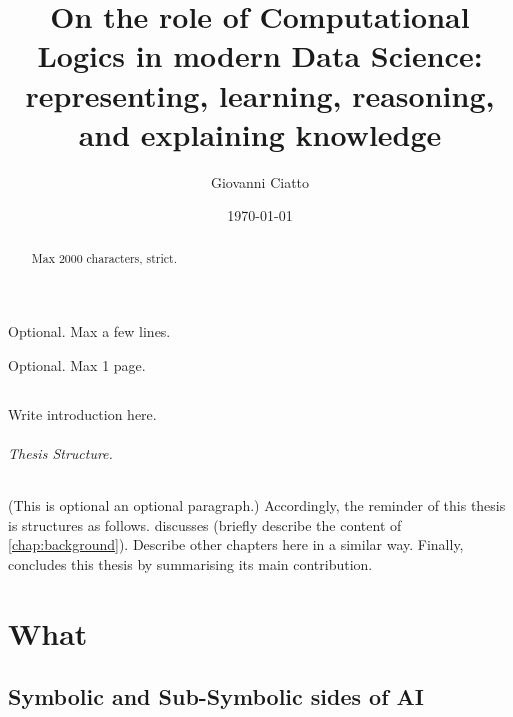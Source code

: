 \documentclass[12pt,a4paper,openright,twoside]{book}
\title{On the role of Computational Logics in modern Data Science: representing, learning, reasoning, and explaining knowledge}
\author{Giovanni Ciatto}
\date{\today}
\begin{document}
	
\frontmatter



\begin{abstract}	
Max 2000 characters, strict.
\end{abstract}

\begin{dedication} %
Optional. Max a few lines.
\end{dedication}

\begin{acknowledgements} %
Optional. Max 1 page.
\end{acknowledgements}

\tableofcontents   
\listoffigures     %
\lstlistoflistings %

\mainmatter

\chapter{\introductionname}
\label{chap:introduction}

Write introduction here.

%
\paragraph{Thesis Structure.} %
%

(This is optional an optional paragraph.)
%
Accordingly, the reminder of this thesis is structures as follows.
%
 discusses (briefly describe the content of \cref{chap:background}).
%
Describe other chapters here in a similar way.
%
Finally,  concludes this thesis by summarising its main contribution.

\part{What}
\label{part:what}

\chapter{Symbolic and Sub-Symbolic sides of AI}
\end{document}

